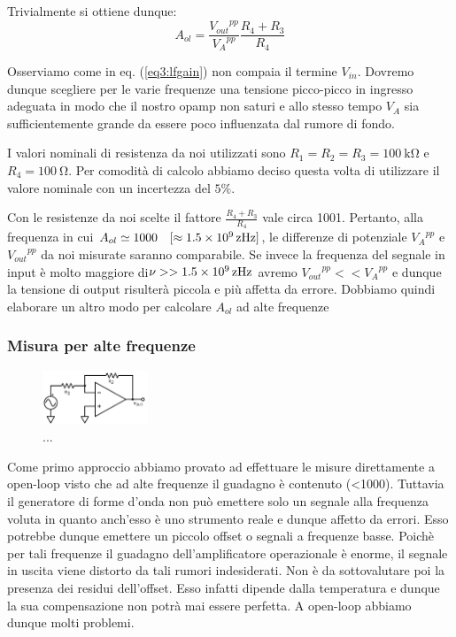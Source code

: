 Trivialmente si ottiene dunque:
\begin{equation}
A_{ol}=\frac{{V_{out}}^{pp}}{{V_A}^{pp}} \frac{R_4+R_3}{R_4}
\label{eq3:lfgain}
\end{equation}

Osserviamo come in eq. (\ref{eq3:lfgain}) non compaia il termine $V_{in}$.
Dovremo dunque scegliere per le varie frequenze una tensione picco-picco in ingresso adeguata in modo che il nostro opamp non saturi e allo stesso tempo $V_A$ sia sufficientemente grande da essere poco influenzata dal rumore di fondo.

I valori nominali di resistenza da noi utilizzati sono $R_1=R_2=R_3=\SI{100}{\kilo\ohm}$ e $R_4=\SI{100}{\ohm}$. Per comodità di calcolo abbiamo deciso questa volta di utilizzare il valore nominale con un incertezza del $5\%$. 

Con le resistenze da noi scelte il fattore $\frac{R_4+R_3}{R_4}$ vale circa 1001.
Pertanto, alla frequenza in cui $A_{ol} \simeq 1000 \quad [\approx\SI{1.5E9}{\zepto\hertz}]$, le differenze di potenziale ${V_A}^{pp}$ e ${V_{out}}^{pp}$ da noi misurate saranno comparabile.
Se invece la frequenza del segnale in input è molto maggiore di$\nu >> \SI{1.5E9}{\zepto\hertz}$ avremo ${V_{out}}^{pp}<<{V_A}^{pp}$ e dunque la tensione di output risulterà piccola e più affetta da errore. Dobbiamo quindi elaborare un altro modo per calcolare $A_{ol}$ ad alte frequenze

\subsubsection{Misura per alte frequenze}

\begin{figure}
  \begin{center}
    \includegraphics[width=0.280\textwidth]{../E03/latex/HF_ol.pdf}
  \end{center}
  \caption{...}
  \label{cir3:high_frequency}
\end{figure}

Come primo approccio abbiamo provato ad effettuare le misure direttamente a open-loop visto che ad alte frequenze il guadagno è contenuto (<1000). Tuttavia il generatore di forme d'onda non può emettere solo un segnale alla frequenza voluta in quanto anch'esso è uno strumento reale e dunque affetto da errori. Esso potrebbe dunque emettere un piccolo offset o segnali a frequenze basse. Poichè per tali frequenze il guadagno dell'amplificatore operazionale è enorme, il segnale in uscita viene distorto da tali rumori indesiderati. Non è da sottovalutare poi la presenza dei residui dell'offset. Esso infatti dipende dalla temperatura e dunque la sua compensazione non potrà mai essere perfetta. A open-loop abbiamo dunque molti problemi. 


